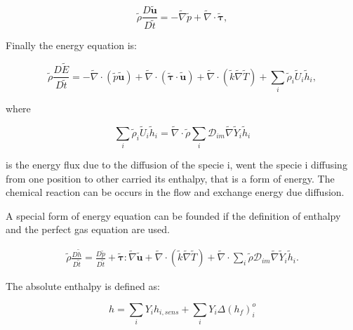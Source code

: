 \documentclass[preprint,12pt,authoryear]{elsarticle}
\begin{document}
\begin{equation}
    \tilde{\rho}\frac{D  \tilde{\mathbf{u}}}{D \tilde{t}}
= - \tilde{\nabla} \tilde{p} 
  + \tilde{\nabla} \cdot \tilde{\pmb{\tau}} 
  ,
\label{eq:momentum}  
\end{equation}

Finally the energy equation is:

\begin{equation}
        \tilde{\rho}\frac{D \tilde{E} }{D \tilde{t}}
=       - 
        \tilde{\nabla} \cdot (\tilde{p} \tilde{\mathbf{u}})
        + 
        \tilde{\nabla} \cdot (\pmb{\tilde{\tau}}\cdot\tilde{\mathbf{u}}) 
        + 
        \tilde{\nabla} \cdot (\tilde{k}\tilde{\nabla} \tilde{T}) 
        + 
        \sum\limits_i \tilde{\rho}_i\tilde{U}_i\tilde{h}_i
  ,
\label{eq:E}  
\end{equation}

where 

\begin{equation}
        \sum\limits_i \tilde{\rho}_i\tilde{U}_i\tilde{h}_i
        =
        \tilde{\nabla} \cdot
        \tilde{\rho}
        \sum\limits_i 
        \mathcal{D}_{im}\tilde{\nabla}\tilde{Y}_i     
        \tilde{h}_i
\end{equation}

is the energy flux due to the diffusion of the specie i, went 
the specie i diffusing from one position to other 
carried its enthalpy, that is a form of energy. 
The chemical reaction can be occurs in the flow 
and exchange energy  due diffusion. 

A special form of energy equation can be founded if the definition of
enthalpy and the perfect gas equation are used. 


\begin{equation}
\begin{split}
        \tilde{\rho}\frac{D  \tilde{h}}{D\tilde{t}}
=
        \frac{D \tilde{p}}{D\tilde{t}}
+       
        \pmb{\tilde{\tau}}:\tilde{\nabla} \tilde{\mathbf{u}} 
+ 
        \tilde{\nabla} \cdot (\tilde{k}\tilde{\nabla} \tilde{T})
+
        \tilde{\nabla} \cdot
        \sum\limits_i 
        \tilde{\rho}\mathcal{D}_{im}\tilde{\nabla}\tilde{Y}_i     
        \tilde{h}_i.
\end{split}
\end{equation}

The absolute enthalpy is defined as:

\begin{equation}
	h=\sum_iY_ih_{i,sens}+\sum_iY_i\Delta(h_f)_i^o
\end{equation}
\end{document}
